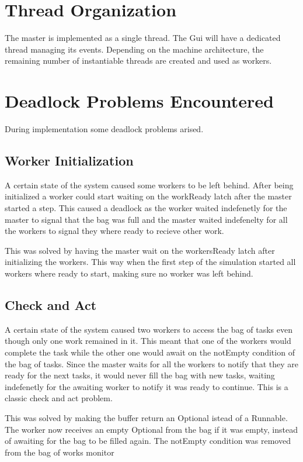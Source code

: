 \documentclass[12pt, a4paper]{report}
\begin{document}
\section{Thread Organization} %
The master is implemented as a single thread. The Gui will have a dedicated thread
 managing its events. Depending on the machine architecture, the remaining number
 of instantiable threads are created and used as workers.

\section{Deadlock Problems Encountered}
During implementation some deadlock problems arised.

\subsection{Worker Initialization}
A certain state of the system caused some workers to be left behind.
 After being initialized a worker could start waiting on the workReady latch after
 the master started a step. This caused a deadlock as the worker waited indefenetly
 for the master to signal that the bag was full and the master waited indefenelty for
 all the workers to signal they where ready to recieve other work.

This was solved by having the master wait on the workersReady latch after initializing
 the workers. This way when the first step of the simulation started all workers where
 ready to start, making sure no worker was left behind.

\subsection{Check and Act}
A certain state of the system caused two workers to access the bag of tasks even though
 only one work remained in it. This meant that one of the workers would complete the task
 while the other one would await on the notEmpty condition of the bag of tasks. Since the
 master waits for all the workers to notify that they are ready for the next tasks, it would
 never fill the bag with new tasks, waiting indefenetly for the awaiting worker to notify
 it was ready to continue. This is a classic check and act problem.
 
This was solved by making the buffer return an Optional istead of a Runnable. The worker
 now receives an empty Optional from the bag if it was empty, instead of awaiting for the
 bag to be filled again. The notEmpty condition was removed from the bag of works monitor
\end{document}
